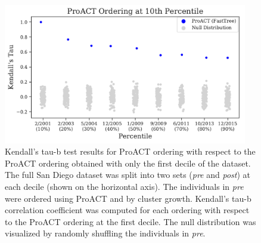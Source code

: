 \documentclass[a4paper,11pt]{article}
\begin{document}
\begin{figure}[!h]
\centering
\includegraphics[width=0.95\textwidth]{figs/results_tautest_first-proact.pdf}
\caption{Kendall's tau-b test results for ProACT ordering with respect to the ProACT ordering obtained with only the first decile of the dataset. The full San Diego dataset was split into two sets (\textit{pre} and \textit{post}) at each decile (shown on the horizontal axis). The individuals in \textit{pre} were ordered using ProACT and by cluster growth. Kendall's tau-b correlation coefficient was computed for each ordering with respect to the ProACT ordering at the first decile. The null distribution was visualized by randomly shuffling the individuals in \textit{pre}.}
\label{fig:tautest-first-proact}
\end{figure}

\clearpage
\end{document}
